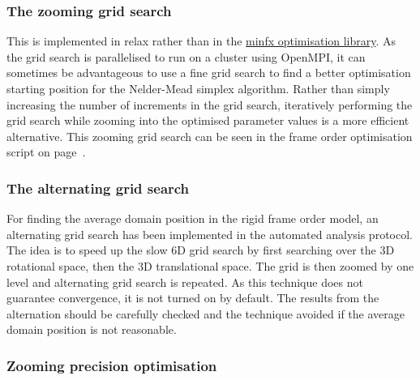 

\subsubsection{The zooming grid search}

This is implemented in relax rather than in the \href{https://gna.org/projects/minfx/}{minfx optimisation library}.
As the grid search is parallelised to run on a cluster using OpenMPI, it can sometimes be advantageous to use a fine grid search to find a better optimisation starting position for the Nelder-Mead simplex algorithm.
Rather than simply increasing the number of increments in the grid search, iteratively performing the grid search while zooming into the optimised parameter values is a more efficient alternative.
This zooming grid search can be seen in the frame order optimisation script on page~\pageref{sect: frame order analysis script}.






\subsubsection{The alternating grid search}

For finding the average domain position in the rigid frame order model, an alternating grid search has been implemented in the automated analysis protocol.
The idea is to speed up the slow 6D grid search by first searching over the 3D rotational space, then the 3D translational space.
The grid is then zoomed by one level and alternating grid search is repeated.
As this technique does not guarantee convergence, it is not turned on by default.
The results from the alternation should be carefully checked and the technique avoided if the average domain position is not reasonable.






\subsubsection{Zooming precision optimisation}

